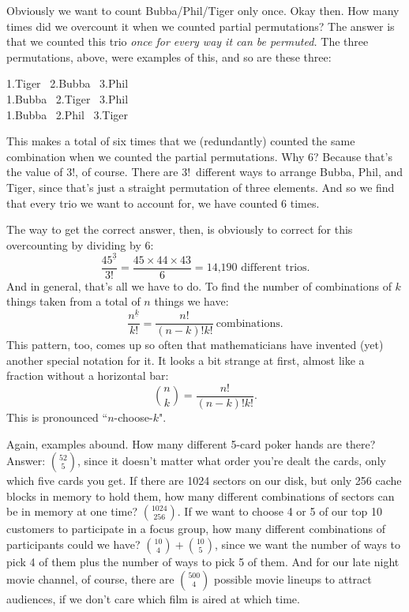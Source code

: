 Obviously we want to count Bubba/Phil/Tiger only once. Okay then. How many
times did we overcount it when we counted partial permutations? The answer
is that we counted this trio \textit{once for every way it can be
permuted.} The three permutations, above, were examples of this, and so are
these three:
\begin{center}
1.Tiger \ 2.Bubba \ 3.Phil \\
1.Bubba \ 2.Tiger \ 3.Phil \\
1.Bubba \ 2.Phil \ 3.Tiger 
\end{center}
This makes a total of six times that we (redundantly) counted the same
combination when we counted the partial permutations. Why 6? Because that's
the value of 3!, of course. There are 3!~different ways to arrange Bubba,
Phil, and Tiger, since that's just a straight permutation of three
elements. And so we find that every trio we want to account for, we
have counted 6 times.

The way to get the correct answer, then, is obviously to correct for this
overcounting by dividing by 6:
\[
\dfrac{45^{\underline{3}}}{3!} = \dfrac{45 \times 44 \times 43}{6} =
\text{14,190 different trios}.
\]
And in general, that's all we have to do. To find the number of
combinations of $k$ things taken from a total of $n$ things we have:
\[
\dfrac{n^{\underline{k}}}{k!} = \dfrac{n!}{(n-k)!k!}\ \text{combinations}.
\]
This pattern, too, comes up so often that mathematicians have invented
(yet) another special notation for it. It looks a bit strange at first,
almost like a fraction without a horizontal bar:
\[
\binom{n}{k} = \dfrac{n!}{(n-k)!k!}.
\]
This is pronounced ``$n$-choose-$k$".

Again, examples abound. How many different 5-card poker hands are there?
Answer: $\binom{52}{5}$, since it doesn't matter what order you're dealt
the cards, only which five cards you get. If there are 1024 sectors on our
disk, but only 256 cache blocks in memory to hold them, how many different
combinations of sectors can be in memory at one time? $\binom{1024}{256}$.
If we want to choose 4 or 5 of our top 10 customers to participate in a
focus group, how many different combinations of participants could we have?
$\binom{10}{4}+\binom{10}{5}$, since we want the number of ways to pick 4
of them plus the number of ways to pick 5 of them. And for our late night
movie channel, of course, there are $\binom{500}{4}$ possible movie lineups
to attract audiences, if we don't care which film is aired at which time.


